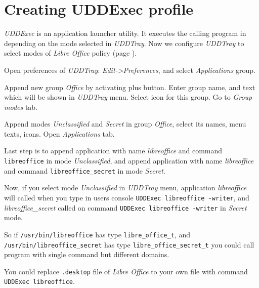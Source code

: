 \section{Creating UDDExec profile}

\emph{UDDExec} is an application launcher utility. It executes the
calling program in depending on the mode selected in \emph{UDDTray}. Now
we configure \emph{UDDTray} to select modes of \emph{Libre Office} policy (page \pageref{creating_new_policy}).

Open preferences of \emph{UDDTray}:
\emph{Edit-\textgreater{}Preferences}, and select \emph{Applications}
group.


Append new group \emph{Office} by activating plus button. Enter group
name, and text which will be shown in \emph{UDDTray} menu. Select icon
for this group. Go to \emph{Group modes} tab.


Append modes \emph{Unclassified} and \emph{Secret} in group
\emph{Office}, select its names, menu texts, icons. Open
\emph{Applications} tab.


Last step is to append application with name \emph{libreoffice} and
command \texttt{libreoffice} in mode \emph{Unclassified}, and append
application with name \emph{libreoffice} and command
\texttt{libreoffice\_secret} in mode \emph{Secret}.

Now, if you select mode \emph{Unclassified} in \emph{UDDTray} menu,
application \emph{libreoffice} will called when you type in users
console \texttt{UDDExec libreoffice -writer}, and
\emph{libreoffice\_secret} called on command
\texttt{UDDExec libreoffice -writer} in \emph{Secret} mode.


So if \texttt{/usr/bin/libreoffice} has type \texttt{libre\_office\_t},
and \texttt{/usr/bin/libreoffice\_secret} has type
\texttt{libre\_office\_secret\_t} you could call program with single
command but different domains.

You could replace \texttt{.desktop} file of \emph{Libre Office} to your
own file with command \texttt{UDDExec libreoffice}.

